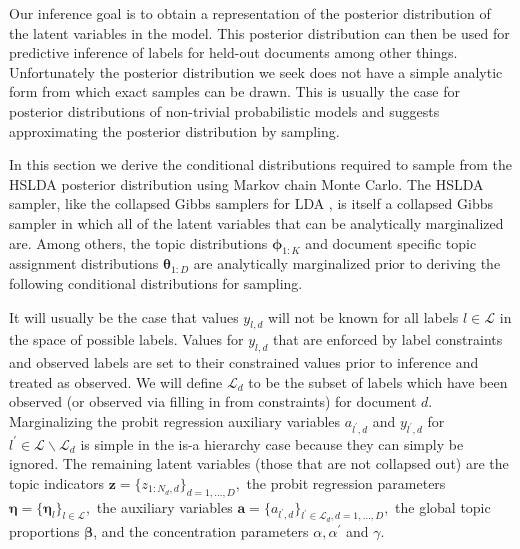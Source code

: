 
\label{sec:inference}
Our inference goal  is to obtain a representation of the posterior distribution
of the latent variables in the model.  This posterior distribution can then be used for predictive inference of labels for held-out documents among other things.  Unfortunately the posterior distribution we seek does not have a simple analytic form from which exact samples can be drawn.
This is usually the case for posterior distributions of non-trivial
probabilistic models and suggests approximating the posterior distribution by sampling.

In this section we derive the conditional distributions required to sample from the HSLDA posterior distribution using Markov chain Monte Carlo.  %
%
The HSLDA sampler, like the collapsed Gibbs samplers for LDA \cite{Griffiths04}, is itself a collapsed Gibbs sampler in which all of the latent variables that can be analytically marginalized are.  Among others, the topic distributions $\boldsymbol{\phi}_{1:K}$
and document specific topic assignment distributions $\boldsymbol{\theta}_{1:D}$ are analytically marginalized prior to deriving the following conditional distributions for sampling.  

  It will usually be the
case that values $y_{l,d}$ will not be known for all labels $l \in \mathcal{L}$ in the space of possible labels.  Values for $y_{l,d}$ that are enforced by label constraints and observed labels are set to their constrained values prior to inference and treated as observed.  We will define $\mathcal{L}_{d}$ to be the subset
of labels which have been observed (or observed via filling in from constraints) for document $d$.   Marginalizing the probit regression auxiliary variables $a_{l^{\prime},d}$ and $y_{l^{\prime},d}$
for $l^{\prime}\in\mathcal{L}\backslash\mathcal{L}_{d}$ is simple in the is-a hierarchy case because they can simply be ignored. 
 The remaining latent variables (those that are not collapsed out) are the topic indicators $\mathbf{z}=\{z_{1:N_{d},d}\}_{d=1,\ldots,D},$ the probit regression parameters $\boldsymbol\eta=\{\boldsymbol\eta_{l}\}_{l\in\mathcal{L}},$ the auxiliary variables $\mathbf{a}=\{a_{l^{\prime},d}\}_{l^{\prime}\in\mathcal{L}_{d},d=1,\ldots,D},$ the global topic proportions $\boldsymbol\beta$, and the concentration parameters $\alpha,\alpha^{\prime}$
and $\gamma$.


